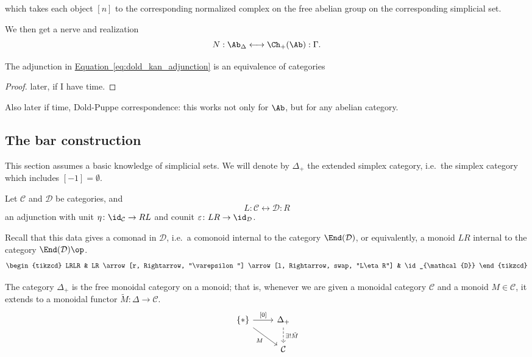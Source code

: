 \documentclass[main.tex]{subfiles}
\begin{document}
which takes each object $[n]$ to the corresponding normalized complex on the free abelian group on the corresponding simplicial set.

We then get a nerve and realization
\begin{equation}
  \label{eq:dold_kan_adjunction}
  N : \Ab_{\Delta} \longleftrightarrow \Ch_{+}(\Ab) : \Gamma.
\end{equation}

\begin{theorem}
  The adjunction in \hyperref[eq:dold_kan_adjunction]{Equation~\ref*{eq:dold_kan_adjunction}} is an equivalence of categories
\end{theorem}
\begin{proof}
  later, if I have time.
\end{proof}

Also later if time, Dold-Puppe correspondence: this works not only for $\Ab$, but for any abelian category.

\subsection{The bar construction}
\label{ssc:the_bar_construction}

This section assumes a basic knowledge of simplicial sets. We will denote by $\Delta_{+}$ the extended simplex category, i.e.\ the simplex category which includes $[-1] = \emptyset$.

Let $\mathcal{C}$ and $\mathcal{D}$ be categories, and
\begin{equation*}
  L : \mathcal{C} \leftrightarrow \mathcal{D} : R
\end{equation*}
an adjunction with unit $\eta\colon \id_{\mathcal{C}} \to RL$ and counit $\varepsilon\colon LR \to \id_{\mathcal{D}}$.

Recall that this data gives a comonad in $\mathcal{D}$, i.e.\ a comonoid internal to the category $\End(\mathcal{D})$, or equivalently, a monoid $LR$ internal to the category $\End(\mathcal{D})\op$.
\begin{equation*}
  \begin{tikzcd}
    LRLR
    & LR
    \arrow[r, Rightarrow, "\varepsilon"]
    \arrow[l, Rightarrow, swap, "L\eta R"]
    & \id_{\mathcal{D}}
  \end{tikzcd}
\end{equation*}

The category $\Delta_{+}$ is the free monoidal category on a monoid; that is, whenever we are given a monoidal category $\mathcal{C}$ and a monoid $M \in \mathcal{C}$, it extends to a monoidal functor $\tilde{M}\colon \Delta \to \mathcal{C}$.
\begin{equation*}
  \begin{tikzcd}
    \{*\}
    \arrow[r, "{[0]}"]
    \arrow[dr, swap, "M"]
    & \Delta_{+}
    \arrow[d, dashed, "\exists! \tilde{M}"]
    \\
    & \mathcal{C}
  \end{tikzcd}
\end{equation*}
\end{document}
